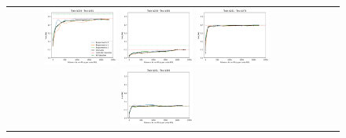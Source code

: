 \begin{figure}[h!]
\begin{tabular}{cccc}
  \includegraphics[width=0.25\textwidth]{Kap7/train=b234_test=b261_rbf_individual_curves.png}  \includegraphics[width=0.25\textwidth]{Kap7/train=b234_test=b360_rbf_individual_curves.png}
  \includegraphics[width=0.25\textwidth]{Kap7/train=b261_test=b278_rbf_individual_curves.png}  \includegraphics[width=0.25\textwidth]{Kap7/train=b261_test=b360_rbf_individual_curves.png} \\


\end{tabular}
\end{figure}
